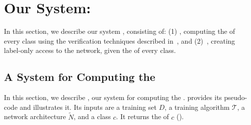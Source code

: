 
\section{Our System: \tool} 
\label{sec:our_approach}
In this section, we describe our system \tool, %
consisting of: (1) \boundtool, computing the \propa of every class using the verification techniques described in~, %
and (2)~\reptool, creating \propi label-only access to the network, given the \propa of every class. 






\subsection{A System for Computing the \propa}\label{sec:ourapp_sys}
In this section, we describe \boundtool, our system for computing the \propa. 
  provides its pseudo-code and  illustrates it. 
Its inputs are a training set $D$, a training algorithm $\mathcal{T}$, a network architecture $\widetilde{N}$, and a class $c$. 
It returns the \propa of $c$ (). 


